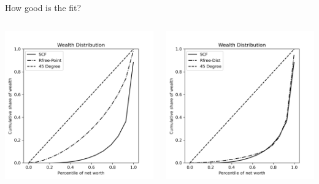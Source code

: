 \documentclass{beamer}
\begin{document}
\begin{frame}{How good is the fit?}
    
   \begin{columns}
    \centering
    \includegraphics[width=\textwidth]{Figures/PYrrPointNetWorthPlot.png}
    
    \centering
    \includegraphics[width=\textwidth]{Figures/PYrrDistNetWorthPlot.png}

  \end{columns}
    
\end{frame}
\end{document}
